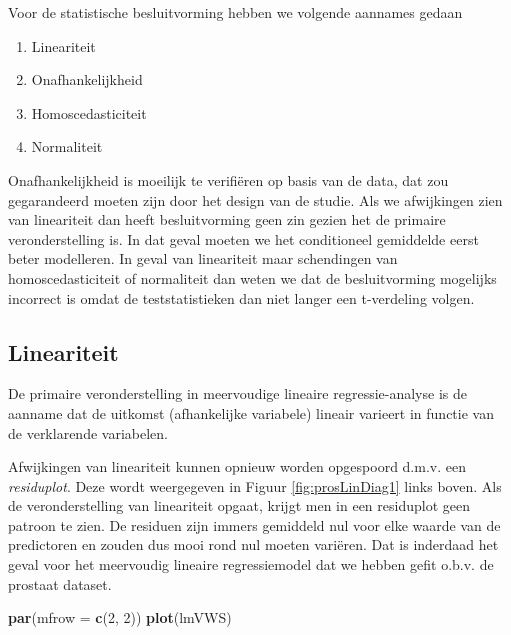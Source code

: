 \documentclass[12pt,dutch,coursenotes]{book}
\newenvironment{Shaded}{\begin{snugshade}}{\end{snugshade}}
\newcommand{\KeywordTok}[1]{\textcolor[rgb]{0.13,0.29,0.53}{\textbf{#1}}}
\newcommand{\DataTypeTok}[1]{\textcolor[rgb]{0.13,0.29,0.53}{#1}}
\newcommand{\DecValTok}[1]{\textcolor[rgb]{0.00,0.00,0.81}{#1}}
\newcommand{\NormalTok}[1]{#1}
\providecommand{\tightlist}{%
  \setlength{\itemsep}{0pt}\setlength{\parskip}{0pt}}
\theoremstyle{definition}
\theoremstyle{definition}
\theoremstyle{definition}
\theoremstyle{remark}
\begin{document}
Voor de statistische besluitvorming hebben we volgende aannames gedaan

\begin{enumerate}
\def\labelenumi{\arabic{enumi}.}
\tightlist
\item
  Lineariteit
\item
  Onafhankelijkheid\\
\item
  Homoscedasticiteit
\item
  Normaliteit
\end{enumerate}

Onafhankelijkheid is moeilijk te verifiëren op basis van de data, dat
zou gegarandeerd moeten zijn door het design van de studie. Als we
afwijkingen zien van lineariteit dan heeft besluitvorming geen zin
gezien het de primaire veronderstelling is. In dat geval moeten we het
conditioneel gemiddelde eerst beter modelleren. In geval van lineariteit
maar schendingen van homoscedasticiteit of normaliteit dan weten we dat
de besluitvorming mogelijks incorrect is omdat de teststatistieken dan
niet langer een t-verdeling volgen.

\subsection{Lineariteit}\label{lineariteit-1}

De primaire veronderstelling in meervoudige lineaire regressie-analyse
is de aanname dat de uitkomst (afhankelijke variabele) lineair varieert
in functie van de verklarende variabelen.

Afwijkingen van lineariteit kunnen opnieuw worden opgespoord d.m.v. een
\emph{residuplot}. Deze wordt weergegeven in Figuur
\ref{fig:prosLinDiag1} links boven. Als de veronderstelling van
lineariteit opgaat, krijgt men in een residuplot geen patroon te zien.
De residuen zijn immers gemiddeld nul voor elke waarde van de
predictoren en zouden dus mooi rond nul moeten variëren. Dat is
inderdaad het geval voor het meervoudig lineaire regressiemodel dat we
hebben gefit o.b.v. de prostaat dataset.

\begin{Shaded}
\begin{Highlighting}[]
\KeywordTok{par}\NormalTok{(}\DataTypeTok{mfrow =} \KeywordTok{c}\NormalTok{(}\DecValTok{2}\NormalTok{, }\DecValTok{2}\NormalTok{))}
\KeywordTok{plot}\NormalTok{(lmVWS)}
\end{Highlighting}
\end{Shaded}
\end{document}
